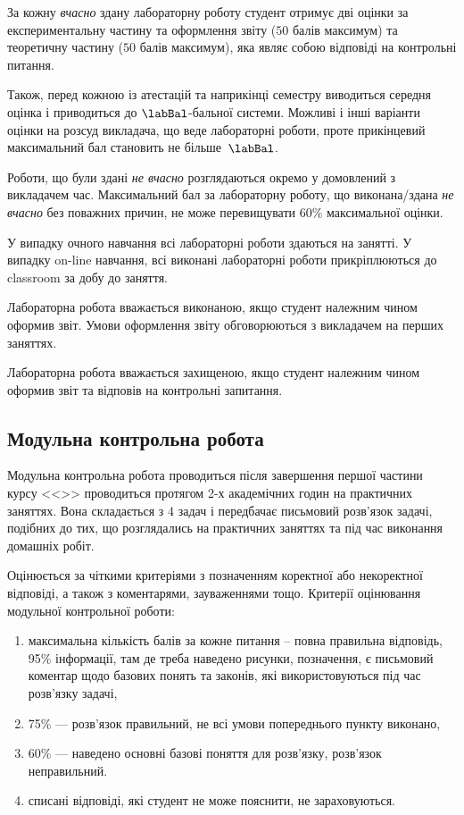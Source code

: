 \documentclass{Syllabus}
\begin{document}
За кожну \emph{вчасно} здану лабораторну роботу студент отримує дві оцінки за експериментальну частину та оформлення звіту ($ 50 $ балів максимум) та теоретичну частину ($ 50 $ балів максимум), яка являє собою відповіді на контрольні питання.

Також, перед кожною із атестацій та наприкінці семестру виводиться середня оцінка  і приводиться до $ \labBal $-бальної системи. Можливі і інші варіанти оцінки на розсуд викладача, що веде лабораторні роботи, проте прикінцевий максимальний бал становить не більше~$\labBal$.

Роботи, що були здані \emph{не вчасно} розглядаються окремо у домовлений з викладачем час. Максимальний бал за лабораторну роботу, що виконана/здана \emph{не вчасно} без поважних причин, не може перевищувати 60\% максимальної оцінки.

У випадку очного навчання всі лабораторні роботи здаються на занятті. У випадку on-line навчання, всі виконані лабораторні роботи прикріплюються до classroom за добу до заняття.

Лабораторна робота вважається виконаною, якщо студент належним чином оформив звіт. Умови оформлення звіту обговорюються з викладачем на перших заняттях.

Лабораторна робота вважається захищеною, якщо студент належним чином оформив звіт та відповів на контрольні запитання.


\subsection*{Модульна контрольна робота}


Модульна контрольна робота проводиться після завершення першої частини курсу <<\discipline>> проводиться протягом 2-х академічних годин на практичних заняттях. Вона складається з $4$ задач і передбачає письмовий розв’язок задачі, подібних до тих, що розглядались на практичних заняттях та під час виконання домашніх робіт.

Оцінюється за чіткими критеріями з позначенням коректної або некоректної відповіді, а також з коментарями, зауваженнями тощо. Критерії оцінювання модульної контрольної роботи:
\begin{enumerate}[label=$\bullet$]
	\item максимальна кількість балів за кожне питання – повна правильна відповідь, 95\% інформації, там де треба наведено рисунки, позначення, є письмовий коментар щодо базових понять та законів, які використовуються під час розв’язку задачі,
	\item 75\%  --- розв’язок правильний, не всі умови попереднього пункту виконано,
	\item 60\%  --- наведено основні базові поняття для розв’язку, розв’язок неправильний.
	\item списані відповіді, які студент не може пояснити, не зараховуються.
\end{enumerate}
\end{document}
